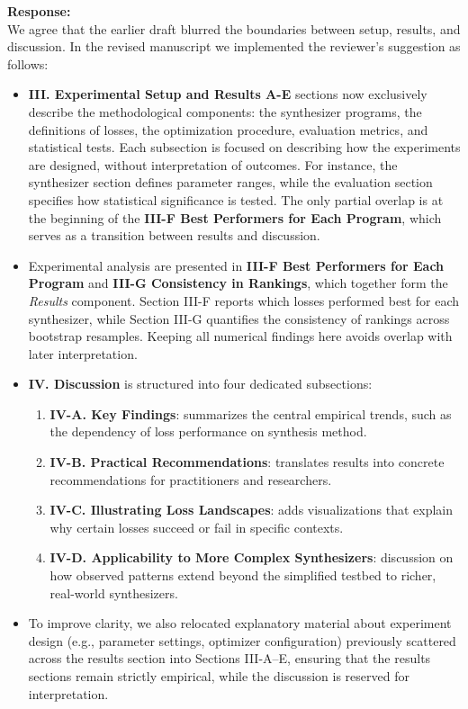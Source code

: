 \documentclass[11pt]{article}
\begin{document}
\noindent\textbf{Response:} \\
We agree that the earlier draft blurred the boundaries between setup, results, and discussion. In the revised manuscript we implemented the reviewer’s suggestion as follows:

\begin{itemize}
  \item \textbf{III. Experimental Setup and Results A-E} sections now exclusively describe the methodological components: the synthesizer programs, the definitions of losses, the optimization procedure, evaluation metrics, and statistical tests. Each subsection is focused on describing how the experiments are designed, without interpretation of outcomes. For instance, the synthesizer section defines parameter ranges, while the evaluation section specifies how statistical significance is tested. The only partial overlap is at the beginning of the \textbf{III-F Best Performers for Each Program}, which serves as a transition between results and discussion.

  \item Experimental analysis are presented in \textbf{III-F Best Performers for Each Program} and \textbf{III-G Consistency in Rankings}, which together form the \emph{Results} component. Section III-F reports which losses performed best for each synthesizer, while Section III-G quantifies the consistency of rankings across bootstrap resamples. Keeping all numerical findings here avoids overlap with later interpretation.  

  \item \textbf{IV. Discussion} is structured into four dedicated subsections:  
    \begin{enumerate}
      \item \textbf{IV-A. Key Findings}: summarizes the central empirical trends, such as the dependency of loss performance on synthesis method.  
      \item \textbf{IV-B. Practical Recommendations}: translates results into concrete recommendations for practitioners and researchers.  
      \item \textbf{IV-C. Illustrating Loss Landscapes}: adds visualizations that explain why certain losses succeed or fail in specific contexts.  
      \item \textbf{IV-D. Applicability to More Complex Synthesizers}: discussion on how observed patterns extend beyond the simplified testbed to richer, real-world synthesizers.  
    \end{enumerate}

  \item To improve clarity, we also relocated explanatory material about experiment design (e.g., parameter settings, optimizer configuration) previously scattered across the results section into Sections III-A–E, ensuring that the results sections remain strictly empirical, while the discussion is reserved for interpretation. 
\end{itemize}
\end{document}
